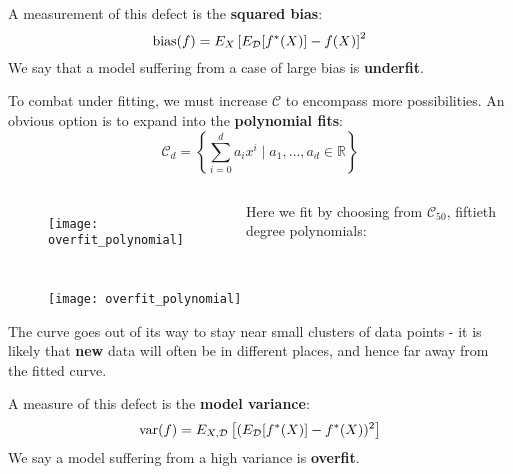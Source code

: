 %
\begin{frame}
  A measurement of this defect is the \textbf{squared bias}:
  $$ \operatorname*{bias}(f) = E_X \left[ E_{\mathcal{D}}[f^*(X)] - f(X) \right] ^2$$
  We say that a model suffering from a case of large bias is \textbf{underfit}.
\end{frame}
%
\begin{frame}
  To combat under fitting, we must increase $\mathcal{C}$ to encompass more possibilities. An obvious option is to expand into the \textbf{polynomial fits}:
  $$\mathcal{C}_d = \left\{ \sum_{i=0}^{d} a_i x^i \mid a_1, \ldots, a_d \in \mathbb{R} \right\}$$
\end{frame}
%
\begin{frame}
  \begin{columns}
      \begin{figure}
        \texttt{[image: overfit\_polynomial]}
      \end{figure}
  Here we fit by choosing from $\mathcal{C}_{50}$, fiftieth degree polynomials:
  \end{columns}
\end{frame}
%
\begin{frame}
  \begin{figure}
    \texttt{[image: overfit\_polynomial]}
  \end{figure}
  The curve goes out of its way to stay near small clusters of data points - it is likely that \textbf{new} data will often be in different places, and hence far away from the fitted curve.
\end{frame}
%
\begin{frame}
  A measure of this defect is the \textbf{model variance}:
  $$ \operatorname*{var}(f) = E_{X, \mathcal{D}} \left[ (E_{\mathcal{D}}[f^*(X)] - f^*(X))^2 \right] $$
  We say a model suffering from a high variance is \textbf{overfit}.
\end{frame}
